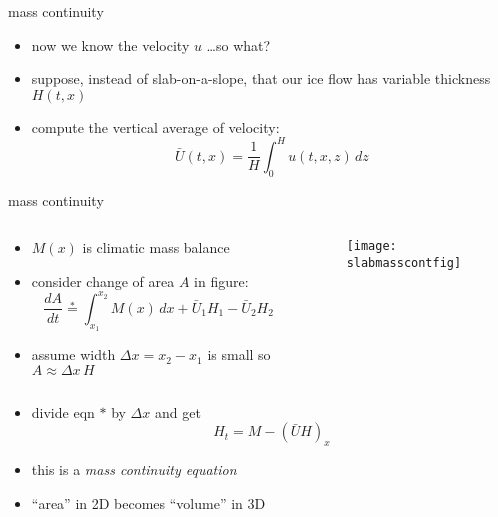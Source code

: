 \begin{frame}{mass continuity}

\begin{itemize}
\item now we know the velocity $u$ \qquad \dots so what?
\item suppose, instead of slab-on-a-slope, that our ice flow has \alert{variable thickness} $H(t,x)$
\item compute the vertical average of velocity:
	$$\bar U(t,x) = \frac{1}{H}\int_0^{H} u(t,x,z)\,dz$$
\end{itemize}
\end{frame}


\begin{frame}{mass continuity }

\begin{columns}
\begin{column}{0.6\textwidth}
\begin{itemize}
\item $M(x)$ is climatic mass balance
\item consider change of area $A$ in figure:
	$$\frac{dA}{dt} \stackrel{\ast}{=} \int_{x_1}^{x_2} M(x)\,dx + \bar U_1 H_1 - \bar U_2 H_2 \phantom{foobar}$$
\item assume width $\Delta x=x_2-x_1$ is small so $A\approx \Delta x\, H$
\end{itemize}
\end{column}
\begin{column}{0.4\textwidth}

\texttt{[image: slabmasscontfig]}

\vspace{0pt}
\end{column}
\end{columns}

\bigskip
\begin{itemize}
\item divide eqn $\ast$ by $\Delta x$ and get
   $$H_t = M - \left(\bar U H\right)_x$$
\item this is a \emph{mass continuity equation}
\item ``area'' in 2D becomes ``volume'' in 3D
\end{itemize}
\end{frame}


